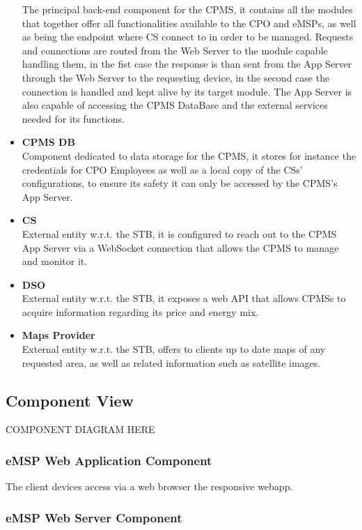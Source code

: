 \documentclass[11pt]{article}
\begin{document}
\begin{itemize}
        The principal back-end component for the CPMS, it contains all the modules that together offer all functionalities available to the CPO and eMSPs, as well as being the endpoint where CS connect to in order to be managed. Requests and connections are routed from the Web Server to the module capable handling them, in the fist case the response is than sent from the App Server through the Web Server to the requesting device, in the second case the connection is handled and kept alive by its target module. The App Server is also capable of accessing the CPMS DataBase and the external services needed for its functions.
    \item \textbf{CPMS DB} \\
        Component dedicated to data storage for the CPMS, it stores for instance the credentials for CPO Employees as well as a local copy of the CSs' configurations, to ensure its safety it can only be accessed by the CPMS's App Server.
    \item \textbf{CS} \\
        External entity w.r.t. the STB, it is configured to reach out to the CPMS App Server via a WebSocket connection that allows the CPMS to manage and monitor it.
    \item \textbf{DSO} \\
        External entity w.r.t. the STB, it exposes a web API that allows CPMSs to acquire information regarding its price and energy mix.
    \item \textbf{Maps Provider} \\
        External entity w.r.t. the STB, offers to clients up to date maps of any requested area, as well as related information such as satellite images.
\end{itemize}

\subsection{Component View}

COMPONENT DIAGRAM HERE

\subsubsection{eMSP Web Application Component}

The client devices access via a web browser the responsive webapp.

\subsubsection{eMSP Web Server Component}
\end{document}
